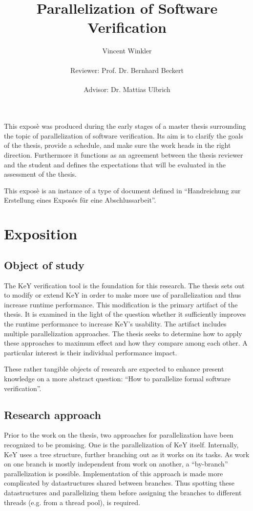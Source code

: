 \documentclass{scrartcl}
\title{Parallelization of Software Verification}
\author{
    Vincent Winkler\\
    \vspace{1em}\\
    Reviewer: Prof. Dr. Bernhard Beckert\\
    \vspace{1em}\\
    Advisor: Dr. Mattias Ulbrich
}
\begin{document}
\maketitle

This exposè was produced during the early stages of a master thesis
surrounding the topic of parallelization of software verification.
Its aim is to clarify the goals of the thesis, provide a schedule,
and make sure the work heads in the right direction.
Furthermore it functions as an agreement between the thesis reviewer and the student
and defines the expectations that will be evaluated in the assessment of the thesis.

This exposè is an instance of a type of document defined in
\enquote{Handreichung zur Erstellung eines Exposés für eine Abschlussarbeit}.

\section{Exposition}
\subsection{Object of study}
The KeY verification tool is the foundation for this research.
The thesis sets out to modify or extend KeY in order to make more use of parallelization
and thus increase runtime performance.
This modification is the primary artifact of the thesis.
It is examined in the light of the question whether it sufficiently improves the runtime
performance to increase KeY's usability.
The artifact includes multiple parallelization approaches.
The thesis seeks to determine how to apply these approaches to maximum effect
and how they compare among each other.
A particular interest is their individual performance impact.

These rather tangible objects of research are expected
to enhance present knowledge on a more abstract question:
\enquote{How to parallelize formal software verification}.

\subsection{Research approach}
Prior to the work on the thesis,
two approaches for parallelization have been recognized to be promising.
One is the parallelization of KeY itself.
Internally, KeY uses a tree structure, further branching out as it works on its tasks.
As work on one branch is mostly independent from work on another,
a \enquote{by-branch} parallelization is possible.
Implementation of this approach is made more complicated
by datastructures shared between branches.
Thus spotting these datastructures and parallelizing them
before assigning the branches to different threads (e.g. from a thread pool),
is required.
\end{document}
